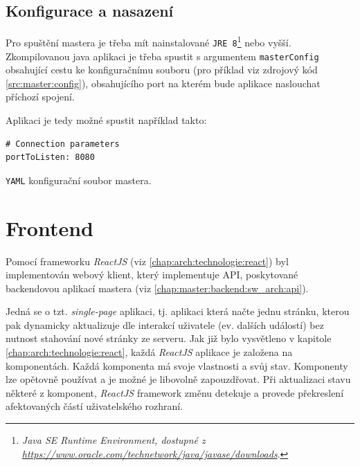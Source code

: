 \subsection{Konfigurace a nasazení}
Pro spuštění mastera je třeba mít nainstalované \texttt{JRE 8}\footnote{\textit{Java SE Runtime Environment, dostupné z\\\url{https://www.oracle.com/technetwork/java/javase/downloads}}.} nebo vyšší.
Zkompilovanou java aplikaci je třeba spustit s argumentem \texttt{masterConfig} obsahující cestu ke konfiguračnímu souboru (pro příklad viz zdrojový kód \ref{src:master:config}), obsahujícího port na kterém bude aplikace naslouchat příchozí spojení.

Aplikaci je tedy možné spustit například takto: 

\begin{code}[h]
  \begin{verbatim}
# Connection parameters
portToListen: 8080
\end{verbatim}
\caption{\texttt{YAML} konfigurační soubor mastera.}
\label{src:master:config}
\end{code}

\section{Frontend}\label{chap:master:frontend}
Pomocí frameworku \textit{ReactJS} (viz \ref{chap:arch:technologie:react}) byl implementován webový klient, který implementuje API, poskytované backendovou aplikací mastera (viz \ref{chap:master:backend:sw_arch:api}). 

Jedná se o tzt. \textit{single-page} aplikaci, tj. aplikaci která načte jednu stránku, kterou pak dynamicky aktualizuje dle interakcí uživatele (ev. dalších událostí) bez nutnost stahování nové stránky ze serveru. Jak již bylo vysvětleno v kapitole \ref{chap:arch:technologie:react}, každá \textit{ReactJS} aplikace je založena na komponentách. Každá komponenta má svoje vlastnosti a svůj stav. Komponenty lze opětovně používat a je možné je libovolně zapouzdřovat. Při aktualizaci stavu některé z komponent, \textit{ReactJS} framework změnu detekuje a provede překreslení afektovaných částí uživatelského rozhraní.

